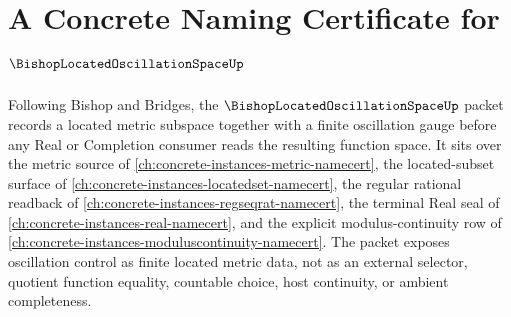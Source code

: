 \chapter{A Concrete Naming Certificate for $\BishopLocatedOscillationSpaceUp$}
\label{ch:concrete-instances-bishop-located-oscillation-space-namecert}

Following Bishop and Bridges, the $\BishopLocatedOscillationSpaceUp$ packet records a located metric subspace together with a finite oscillation gauge before any Real or Completion consumer reads the resulting function space. It sits over the metric source of \autoref{ch:concrete-instances-metric-namecert}, the located-subset surface of \autoref{ch:concrete-instances-locatedset-namecert}, the regular rational readback of \autoref{ch:concrete-instances-regseqrat-namecert}, the terminal Real seal of \autoref{ch:concrete-instances-real-namecert}, and the explicit modulus-continuity row of \autoref{ch:concrete-instances-moduluscontinuity-namecert}. The packet exposes oscillation control as finite located metric data, not as an external selector, quotient function equality, countable choice, host continuity, or ambient completeness.


